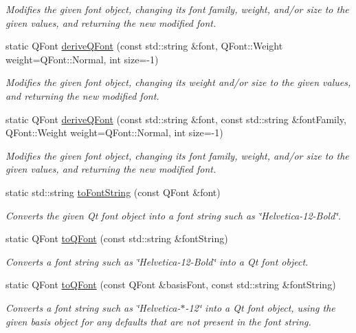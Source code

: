 \begin{DoxyCompactItemize}
\begin{DoxyCompactList}\small\item\em Modifies the given font object, changing its font family, weight, and/or size to the given values, and returning the new modified font. \end{DoxyCompactList}\item 
static Q\+Font \mbox{\hyperlink{classGFont_a6fdde28adfdce9b43b7eb4d4a47ca23b}{derive\+Q\+Font}} (const std\+::string \&font, Q\+Font\+::\+Weight weight=Q\+Font\+::\+Normal, int size=-\/1)
\begin{DoxyCompactList}\small\item\em Modifies the given font object, changing its weight and/or size to the given values, and returning the new modified font. \end{DoxyCompactList}\item 
static Q\+Font \mbox{\hyperlink{classGFont_a50c41ebc7de0a4a038852b0764d3a6f2}{derive\+Q\+Font}} (const std\+::string \&font, const std\+::string \&font\+Family, Q\+Font\+::\+Weight weight=Q\+Font\+::\+Normal, int size=-\/1)
\begin{DoxyCompactList}\small\item\em Modifies the given font object, changing its font family, weight, and/or size to the given values, and returning the new modified font. \end{DoxyCompactList}\item 
static std\+::string \mbox{\hyperlink{classGFont_a1e897239fcf0fa78a33f3021a98b0029}{to\+Font\+String}} (const Q\+Font \&font)
\begin{DoxyCompactList}\small\item\em Converts the given Qt font object into a font string such as \char`\"{}\+Helvetica-\/12-\/\+Bold\char`\"{}. \end{DoxyCompactList}\item 
static Q\+Font \mbox{\hyperlink{classGFont_aea0f70979b631219291103391bfacc6e}{to\+Q\+Font}} (const std\+::string \&font\+String)
\begin{DoxyCompactList}\small\item\em Converts a font string such as \char`\"{}\+Helvetica-\/12-\/\+Bold\char`\"{} into a Qt font object. \end{DoxyCompactList}\item 
static Q\+Font \mbox{\hyperlink{classGFont_a7eea6ca714d168dc53c86124bb4fc387}{to\+Q\+Font}} (const Q\+Font \&basis\+Font, const std\+::string \&font\+String)
\begin{DoxyCompactList}\small\item\em Converts a font string such as \char`\"{}\+Helvetica-\/$\ast$-\/12\char`\"{} into a Qt font object, using the given \textquotesingle{}basis\textquotesingle{} object for any defaults that are not present in the font string. \end{DoxyCompactList}\end{DoxyCompactItemize}



